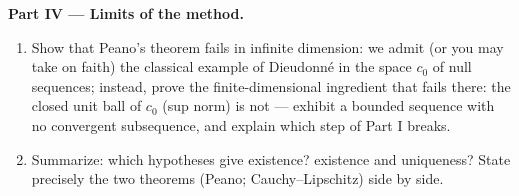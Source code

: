 \begin{problem}[{Weekend problem --- existence of solutions of
$x' = f(t, x)$ without Lipschitz}]
\medskip
\noindent\textbf{Part IV --- Limits of the method.}
\begin{enumerate}[resume]
  \item Show that Peano's theorem fails in infinite dimension:
        we admit (or you may take on faith) the classical
        example of Dieudonn\'e in the space $c_0$ of null
        sequences; instead, prove the finite-dimensional
        ingredient that fails there: the closed unit ball of
        $c_0$ (sup norm) is not  --- exhibit a bounded
        sequence with no convergent subsequence, and explain
        which step of Part I breaks.
  \item Summarize: which hypotheses give existence? existence
        and uniqueness? State precisely the two theorems
        (Peano; Cauchy--Lipschitz) side by side.
\end{enumerate}


\end{problem}
